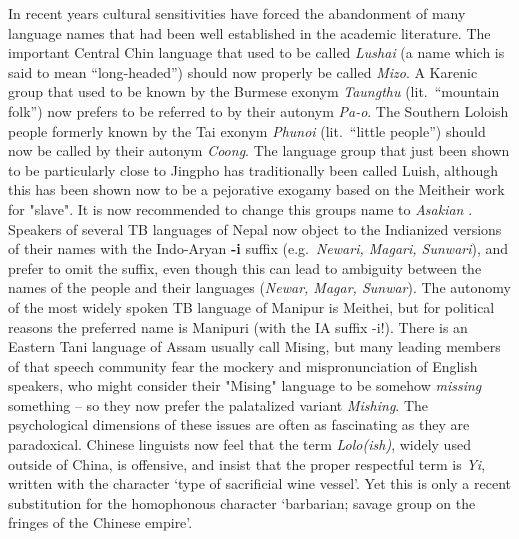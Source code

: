 In recent years cultural sensitivities have forced the abandonment of many
language names that had been well established in the academic literature.  The
important Central Chin language that used to be called \textit{Lushai} (a name which is
said to mean “long-headed”) should now properly be called \textit{Mizo}.
A Karenic group
that used to be known by the Burmese exonym \textit{Taungthu} (lit.\ “mountain folk”) now
prefers to be referred to by their autonym \textit{Pa-o}.  The Southern Loloish people
formerly known by the Tai exonym \textit{Phunoi} (lit.\ “little people”) should now be
called by their autonym \textit{Coong}.  The language group that just been shown to be particularly close to Jingpho has traditionally been called Luish, although this has been shown now to be a pejorative exogamy based on the Meitheir work for "slave".  It is now recommended to change this groups name to \textit{Asakian} \citealt{JAM-2013}.
Speakers of several TB languages of Nepal now
object to the Indianized versions of their names with the Indo-Aryan \textbf{-i} suffix
(e.g.\ \textit{Newari, Magari, Sunwari}), and prefer to omit the suffix, even though this
can lead to ambiguity between the names of the people and their languages
(\textit{Newar, Magar, Sunwar}).  
The autonomy of the most widely spoken TB language of Manipur is Meithei, but for political reasons the preferred name is Manipuri (with the IA suffix -i!).
There is an Eastern Tani language of Assam usually call Mising, but many leading members of that speech community fear the mockery and mispronunciation of English speakers, who might consider their "Mising" language to be somehow \textit{missing} something -- so they now prefer the palatalized variant \textit{Mishing}.  The psychological dimensions of these issues are often
as fascinating as they are paradoxical.  Chinese linguists now feel that the
term \textit{Lolo(ish)}, widely used outside of China,
is offensive, and insist that the
proper respectful term is \textit{Yi}, written with the character  ‘type of
sacrificial wine vessel’.  Yet this is only a recent substitution for the
homophonous character  ‘barbarian; savage group on the fringes of the Chinese
empire’.

